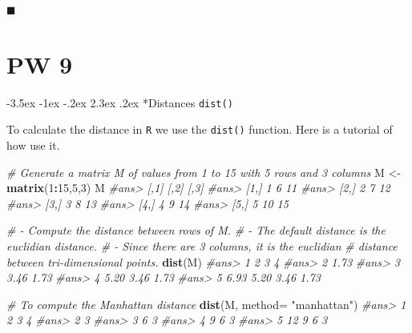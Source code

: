 \documentclass[]{book}
\makeatletter
\newenvironment{Shaded}{\begin{snugshade}}{\end{snugshade}}
\newcommand{\KeywordTok}[1]{\textcolor[rgb]{0.13,0.29,0.53}{\textbf{#1}}}
\newcommand{\DataTypeTok}[1]{\textcolor[rgb]{0.13,0.29,0.53}{#1}}
\newcommand{\DecValTok}[1]{\textcolor[rgb]{0.00,0.00,0.81}{#1}}
\newcommand{\StringTok}[1]{\textcolor[rgb]{0.31,0.60,0.02}{#1}}
\newcommand{\CommentTok}[1]{\textcolor[rgb]{0.56,0.35,0.01}{\textit{#1}}}
\newcommand{\OperatorTok}[1]{\textcolor[rgb]{0.81,0.36,0.00}{\textbf{#1}}}
\newcommand{\NormalTok}[1]{#1}
\renewcommand\section{\@startsection {section}{1}{\z@}%
                                   {-3.5ex \@plus -1ex \@minus -.2ex}%
                                   {2.3ex \@plus.2ex}%
                                   {\normalfont\Large\bfseries\color{ForestGreen}}}
\theoremstyle{definition}
\theoremstyle{definition}
\theoremstyle{definition}
\theoremstyle{remark}
\makeatother
\begin{document}
◼

\chapter*{PW 9}\label{pw-9}

\section*{\texorpdfstring{Distances
\texttt{dist()}}{Distances dist()}}\label{distances-dist}

To calculate the distance in \texttt{R} we use the \texttt{dist()}
function. Here is a tutorial of how use it.

\begin{Shaded}
\begin{Highlighting}[]
\CommentTok{# Generate a matrix M of values from 1 to 15 with 5 rows and 3 columns}
\NormalTok{M <-}\StringTok{ }\KeywordTok{matrix}\NormalTok{(}\DecValTok{1}\OperatorTok{:}\DecValTok{15}\NormalTok{,}\DecValTok{5}\NormalTok{,}\DecValTok{3}\NormalTok{)}
\NormalTok{M}
\CommentTok{#ans>      [,1] [,2] [,3]}
\CommentTok{#ans> [1,]    1    6   11}
\CommentTok{#ans> [2,]    2    7   12}
\CommentTok{#ans> [3,]    3    8   13}
\CommentTok{#ans> [4,]    4    9   14}
\CommentTok{#ans> [5,]    5   10   15}
\end{Highlighting}
\end{Shaded}

\begin{Shaded}
\begin{Highlighting}[]
\CommentTok{# - Compute the distance between rows of M.}
\CommentTok{# - The default distance is the euclidian distance.}
\CommentTok{# - Since there are 3 columns, it is the euclidian}
\CommentTok{#        distance between tri-dimensional points.}
\KeywordTok{dist}\NormalTok{(M)}
\CommentTok{#ans>      1    2    3    4}
\CommentTok{#ans> 2 1.73               }
\CommentTok{#ans> 3 3.46 1.73          }
\CommentTok{#ans> 4 5.20 3.46 1.73     }
\CommentTok{#ans> 5 6.93 5.20 3.46 1.73}
\end{Highlighting}
\end{Shaded}

\begin{Shaded}
\begin{Highlighting}[]
\CommentTok{# To compute the Manhattan distance }
\KeywordTok{dist}\NormalTok{(M, }\DataTypeTok{method=} \StringTok{"manhattan"}\NormalTok{)}
\CommentTok{#ans>    1  2  3  4}
\CommentTok{#ans> 2  3         }
\CommentTok{#ans> 3  6  3      }
\CommentTok{#ans> 4  9  6  3   }
\CommentTok{#ans> 5 12  9  6  3}
\end{Highlighting}
\end{Shaded}
\end{document}
